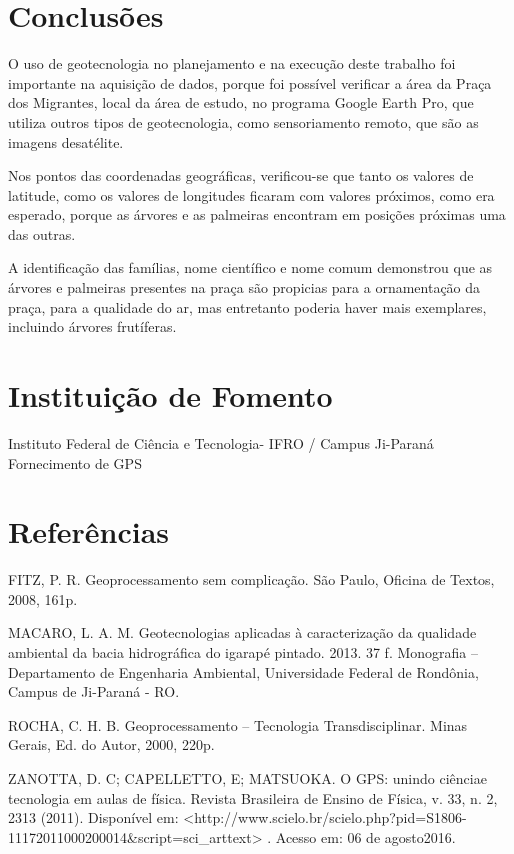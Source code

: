 \documentclass[article,12pt,onesidea,4paper,english,brazil]{abntex2}
\begin{document}
	
	\section*{Conclusões}
	
O uso de geotecnologia no planejamento e na execução deste trabalho foi importante na aquisição de dados, porque foi possível verificar a área da Praça dos Migrantes, local da área de estudo, no programa Google Earth Pro, que utiliza outros tipos de geotecnologia, como sensoriamento remoto, que são as imagens desatélite.

Nos pontos das coordenadas geográficas, verificou-se que tanto os valores de latitude, como os valores de longitudes ficaram com valores próximos, como era esperado, porque as árvores e as palmeiras encontram em posições próximas uma das outras.

A identificação das famílias, nome científico e nome comum demonstrou que as árvores e palmeiras presentes na praça são propicias para a ornamentação da praça, para a qualidade do ar, mas entretanto poderia haver mais exemplares, incluindo árvores frutíferas.
	\section*{Instituição de Fomento}
	
Instituto Federal de Ciência e Tecnologia- IFRO / Campus Ji-Paraná Fornecimento de GPS
	
	\section*{Referências}
	

\noindent FITZ, P. R. Geoprocessamento sem complicação. São Paulo, Oficina de Textos, 2008, 161p.

\noindent MACARO, L. A. M. Geotecnologias aplicadas à caracterização da qualidade ambiental da bacia hidrográfica do igarapé pintado. 2013. 37 f. Monografia – Departamento de Engenharia Ambiental, Universidade Federal de Rondônia, Campus de Ji-Paraná - RO.

\noindent ROCHA, C. H. B. Geoprocessamento – Tecnologia Transdisciplinar. Minas Gerais, Ed. do Autor, 2000, 220p.

\noindent ZANOTTA, D. C; CAPELLETTO, E; MATSUOKA. O GPS: unindo ciênciae
tecnologia em aulas de física. Revista Brasileira de Ensino de Física, v. 33, n. 2, 2313 (2011). Disponível em: <http://www.scielo.br/scielo.php?pid=S1806-11172011000200014\&script=sci\_arttext> . Acesso em: 06 de agosto2016.



	
\end{document}
